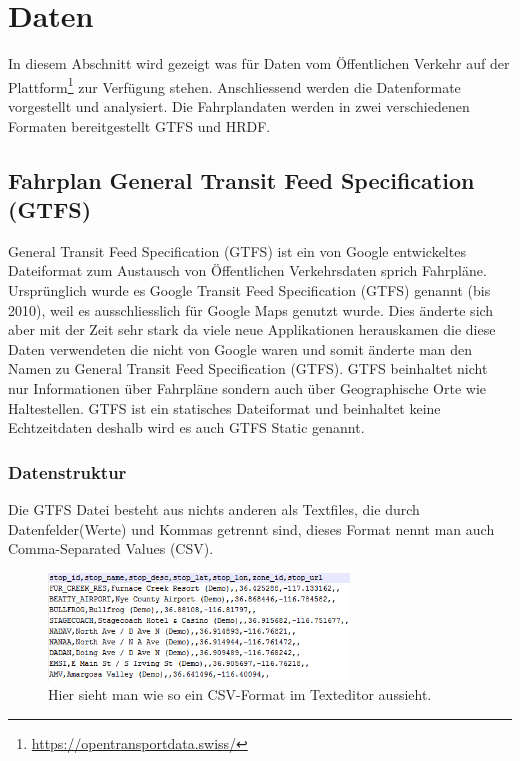 \documentclass[a4paper,12pt]{scrartcl}
\begin{document}
\section{Daten}
\label{sec:daten}
In diesem Abschnitt wird gezeigt was für Daten vom Öffentlichen Verkehr auf der Plattform\footnote{\url{https://opentransportdata.swiss/}} zur Verfügung stehen. Anschliessend werden die Datenformate vorgestellt und analysiert. Die Fahrplandaten werden in zwei verschiedenen Formaten bereitgestellt GTFS und HRDF. 

\subsection{Fahrplan General Transit Feed Specification (GTFS)}
\label{sec:gtfs-static}
General Transit Feed Specification (GTFS) ist ein von Google entwickeltes Dateiformat zum Austausch von Öffentlichen Verkehrsdaten sprich Fahrpläne. Ursprünglich wurde es Google Transit Feed Specification (GTFS) genannt (bis 2010), weil es ausschliesslich für Google Maps genutzt wurde. Dies änderte sich aber mit der Zeit sehr stark da viele neue Applikationen herauskamen die diese Daten verwendeten die nicht von Google waren und somit änderte man den Namen zu General Transit Feed Specification (GTFS).\cite{gtfsbackground}
\newline
GTFS beinhaltet nicht nur Informationen über Fahrpläne sondern auch über Geographische Orte wie Haltestellen. GTFS ist ein statisches Dateiformat und beinhaltet keine Echtzeitdaten deshalb wird es auch GTFS Static genannt.\cite{gtfs}

\subsubsection{Datenstruktur}
\label{sec:gtfs-datenstruktur}
Die GTFS Datei besteht aus nichts anderen als Textfiles, die durch Datenfelder(Werte) und Kommas getrennt sind, dieses Format nennt man auch Comma-Separated Values (CSV).

\begin{figure}[]
	\centering
	\includegraphics[width=8cm]{img/bspcsv.png}
	\caption{Hier sieht man wie so ein CSV-Format im Texteditor aussieht.}
	\label{fig:gtfs-dateiformat}
\end{figure}
\end{document}
